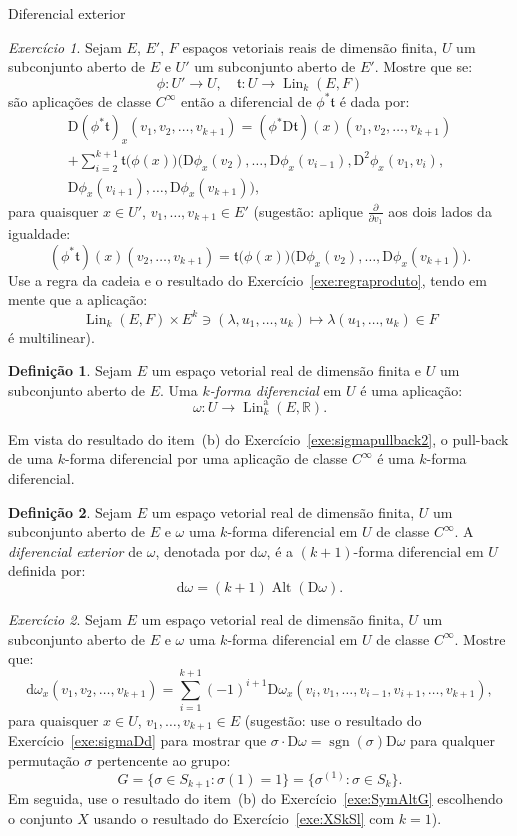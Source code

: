 \documentclass[oneside,11pt]{amsart}
\newcommand{\R}{\mathds R}
\newcommand{\dd}{\mathrm d}
\newcommand{\Dd}{\mathrm D}
\DeclareMathOperator{\Lin}{Lin}
\DeclareMathOperator{\sgn}{sgn}
\DeclareMathOperator{\Alt}{Alt}
\theoremstyle{remark}\newtheorem{exercise}{Exercício}[section]
\theoremstyle{plain}\newtheorem{teo}{Teorema}[section]
\theoremstyle{plain}\newtheorem{lem}[teo]{Lema}
\theoremstyle{plain}\newtheorem{prop}[teo]{Proposição}
\theoremstyle{definition}\newtheorem{defin}[teo]{Definição}
\theoremstyle{remark}\newtheorem{rem}[teo]{Observação}
\theoremstyle{definition}\newtheorem{example}[teo]{Exemplo}
\numberwithin{equation}{section}
\begin{document}
\begin{section}{Diferencial exterior}
\begin{exercise}\label{exe:Dpullback}
Sejam $E$, $E'$, $F$ espaços vetoriais reais de dimensão finita, $U$ um subconjunto aberto de $E$ e $U'$ um subconjunto aberto de $E'$.
Mostre que se:
\[\phi:U'\longrightarrow U,\quad\mathfrak t:U\longrightarrow\Lin_k(E,F)\]
são aplicações de classe $C^\infty$ então a diferencial de $\phi^*\mathfrak t$ é dada por:
\begin{multline*}
\Dd(\phi^*\mathfrak t)_x(v_1,v_2,\ldots,v_{k+1})=(\phi^*\Dd\mathfrak t)(x)(v_1,v_2,\ldots,v_{k+1})\\
+\sum_{i=2}^{k+1}\mathfrak t\big(\phi(x)\big)\big(\Dd\phi_x(v_2),\ldots,\Dd\phi_x(v_{i-1}),\Dd^2\phi_x(v_1,v_i),\\
\Dd\phi_x(v_{i+1}),\ldots,\Dd\phi_x(v_{k+1})\big),
\end{multline*}
para quaisquer $x\in U'$, $v_1,\ldots,v_{k+1}\in E'$ (sugestão: aplique $\frac{\partial}{\partial v_1}$ aos dois lados da igualdade:
\[(\phi^*\mathfrak t)(x)(v_2,\ldots,v_{k+1})=\mathfrak t\big(\phi(x)\big)\big(\Dd\phi_x(v_2),\ldots,\Dd\phi_x(v_{k+1})\big).\]
Use a regra da cadeia e o resultado do Exercício~\ref{exe:regraproduto}, tendo em mente que
a aplicação:
\[\Lin_k(E,F)\times E^k\ni(\lambda,u_1,\ldots,u_k)\longmapsto\lambda(u_1,\ldots,u_k)\in F\]
é multilinear).
\end{exercise}

\begin{defin}
Sejam $E$ um espaço vetorial real de dimensão finita e $U$ um subconjunto aberto de $E$. Uma {\em $k$-forma diferencial\/} em $U$ é uma aplicação:
\[\omega:U\longrightarrow\Lin_k^{\mathrm a}(E,\R).\]
\end{defin}
Em vista do resultado do item~(b) do Exercício~\ref{exe:sigmapullback2},
o pull-back de uma $k$-forma diferencial por uma aplicação de classe $C^\infty$ é uma $k$-forma diferencial.

\begin{defin}
Sejam $E$ um espaço vetorial real de dimensão finita, $U$ um subconjunto aberto de $E$ e $\omega$ uma $k$-forma diferencial em $U$
de classe $C^\infty$. A {\em diferencial exterior\/}
de $\omega$, denotada por $\dd\omega$, é a $(k+1)$-forma diferencial em $U$ definida por:
\[\dd\omega=(k+1)\Alt(\Dd\omega).\]
\end{defin}

\begin{exercise}
Sejam $E$ um espaço vetorial real de dimensão finita, $U$ um subconjunto aberto de $E$ e $\omega$ uma $k$-forma diferencial em $U$
de classe $C^\infty$. Mostre que:
\[\dd\omega_x(v_1,v_2,\ldots,v_{k+1})=\sum_{i=1}^{k+1}(-1)^{i+1}\Dd\omega_x(v_i,v_1,\ldots,v_{i-1},v_{i+1},\ldots,v_{k+1}),\]
para quaisquer $x\in U$, $v_1,\ldots,v_{k+1}\in E$ (sugestão: use o resultado do Exercício~\ref{exe:sigmaDd} para mostrar que
$\sigma\cdot\Dd\omega=\sgn(\sigma)\Dd\omega$ para qualquer permutação $\sigma$ pertencente ao grupo:
\[G=\big\{\sigma\in S_{k+1}:\sigma(1)=1\big\}=\big\{\sigma^{(1)}:\sigma\in S_k\big\}.\]
Em seguida, use o resultado
do item~(b) do Exercício~\ref{exe:SymAltG} escolhendo o conjunto $X$ usando o resultado do Exercício~\ref{exe:XSkSl} com $k=1$).
\end{exercise}


\end{section}
\end{document}
